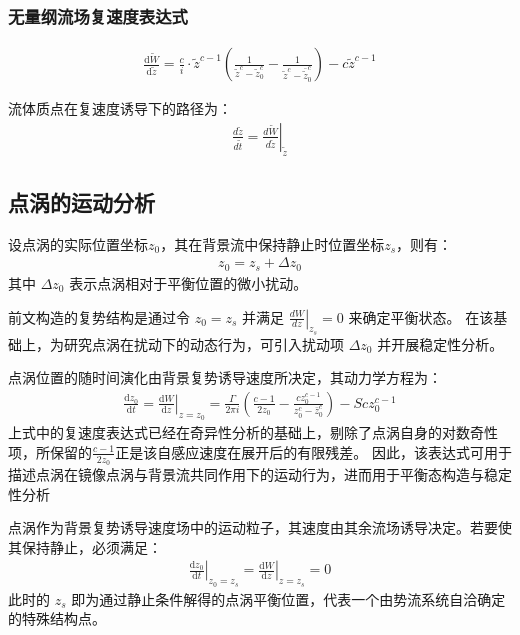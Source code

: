 \subsubsection{无量纲流场复速度表达式}

\begin{align}
    \frac{\mathrm{d}\tilde{W}}{\mathrm{d}\tilde{z}} = \frac{c}{i} \cdot \tilde{z}^{c-1} \left( \frac{1}{\tilde{z}^{c} - \tilde{z}_0^{c}} - \frac{1}{\tilde{z}^{c} - \bar{\tilde{z}}_0^{c}} \right) - c \tilde{z}^{c-1}
\end{align}

流体质点在复速度诱导下的路径为：
\begin{align}
    \frac{d\tilde{z}}{d\tilde{t}} = \left. \frac{d\tilde{W}}{d\tilde{z}} \right|_{\tilde{z}}
\end{align}

\subsection{点涡的运动分析}
设点涡的实际位置坐标$z_{0}$，其在背景流中保持静止时位置坐标$z_{s}$，则有：
\begin{align}
    z_{0}=z_{s}+\Delta z_{0}
\end{align}
其中 $\Delta z_0$ 表示点涡相对于平衡位置的微小扰动。

前文构造的复势结构是通过令 $z_0 = z_s$ 并满足 $\left.\frac{dW}{dz}\right|_{z_s} = 0$ 来确定平衡状态。
在该基础上，为研究点涡在扰动下的动态行为，可引入扰动项 $\Delta z_0$ 并开展稳定性分析。

点涡位置的随时间演化由背景复势诱导速度所决定，其动力学方程为：
\begin{align}
    \frac{\mathrm{d}z_{0}}{\mathrm{d}t}=\left.\frac{\mathrm{d}W}{\mathrm{d}z}\right|_{z=z_{0}}=\frac{\Gamma}{2\pi i}\left(\frac{c-1}{2z_{0}}-\frac{cz_{0}^{c-1}}{z_{0}^{c}-\bar{z}_{0}^{c}}\right)-Scz_{0}^{c-1}
\end{align}
上式中的复速度表达式已经在奇异性分析的基础上，剔除了点涡自身的对数奇性项，所保留的$\frac{c-1}{2z_{0}}$正是该自感应速度在展开后的有限残差。
因此，该表达式可用于描述点涡在镜像点涡与背景流共同作用下的运动行为，进而用于平衡态构造与稳定性分析

点涡作为背景复势诱导速度场中的运动粒子，其速度由其余流场诱导决定。若要使其保持静止，必须满足：
\begin{align}
    \left.\frac{\mathrm{d}z_{0}}{\mathrm{d}t}\right|_{z_{0}=z_{s}}=\left.\frac{\mathrm{d}W}{\mathrm{d}z}\right|_{z=z_{s}}=0
\end{align}
此时的 $z_s$ 即为通过静止条件解得的点涡平衡位置，代表一个由势流系统自洽确定的特殊结构点。

